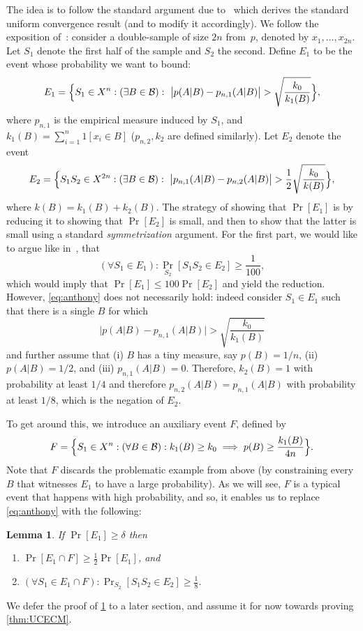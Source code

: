 \documentclass{article}
\newtheorem{lemma}[theorem]{Lemma}
\newcommand{\B}{{\cal B}}
\newcommand{\comment}[3]{\marginpar{\textcolor{#2}{#1: #3}}}
\newcommand{\yoav}[1]{\comment{Yoav}{blue}{#1}}
\begin{document}
The idea is to follow the standard argument due to~\cite{vapnik} 
which derives the standard uniform convergence result (and to modify it accordingly). 
We follow the exposition of~\cite{anthony}:
consider a double-sample of size $2n$ from~$p$, denoted by $x_1,\ldots,x_{2n}$.
Let $S_1$ denote the first half of the sample and $S_2$ the second.
Define $E_1$ to be the event whose probability we want to bound:
\[E_1 = \Bigl\{ S_1\in X^n : (\exists B\in \B):~ 
\bigl\lvert p(A \vert B) - p_{n,1}(A \vert B) \bigr\rvert > 
\sqrt{\frac{k_0}{k_{1}(B)}} \Bigr\},\]
where $p_{n,1}$ is the empirical measure induced by $S_1$, 
and $k_{1}(B)=\sum_{i=1}^n 1[x_i\in B]$ ($p_{n,2}, k_{2}$ are defined similarly).
Let $E_2$ denote the event
\[E_2 = 
\Bigl\{
S_1S_2\in X^{2n} : (\exists B\in\B):~
\bigl\lvert p_{n,1}(A \vert B)   -  p_{n,2}(A \vert B) \bigr\rvert >  
{\frac{1}{2}}\sqrt{\frac{k_0}{k(B)}}
\Bigr\},
\]
where $k(B) = k_{1}(B)+k_{2}(B)$.
The strategy of showing that $\Pr[E_1]$ is by reducing it to showing that $\Pr[E_2]$ 
is small, and then to show that the latter is small using a standard \emph{symmetrization} argument. 
For the first part, we would like to argue like in~\cite{anthony}, that
\begin{equation}\label{eq:anthony} 
(\forall S_1\in E_1): \Pr_{S_2}[S_1S_2\in E_2]\geq \frac{1}{100},
\end{equation}
which would imply that $\Pr[E_1]\leq 100\Pr[E_2]$ and yield the reduction.
However, \ref{eq:anthony} does not necessarily hold: indeed consider
$S_1\in E_1$ such that there is a single $B$ for which 
\[
\bigl\lvert p(A \vert B) - p_{n,1}(A \vert B) \bigr\rvert > 
\sqrt{\frac{k_0}{k_{1}(B)}}
\]
and further assume that 
(i) $B$ has a tiny measure, say $p(B) = 1/n$,
(ii) $p(A\vert B)= 1/2$, and
(iii) $p_{n,1}(A\vert B) = 0$.
Therefore, $k_2(B)=1$ with probability at least $1/4$
and therefore $p_{n,2}(A \vert B)=p_{n,1}(A \vert B)$
with probability at least $1/8$, which is the negation of $E_2$.

To get around this, we introduce an auxiliary event $F$, defined by
\[F = \Bigl\{S_1\in X^{n} : (\forall B\in\B): k_{1}(B) \geq k_0 \implies p(B)\geq \frac{k_{1}(B)}{4n}\Bigr\}. \]
\yoav{I find it more natural to define the complement of $F$, i.e. the
  set of samples for which there exists a ball where the bad thing happens.}
Note that $F$ discards the problematic example from above 
(by constraining every $B$ that witnesses $E_1$ to have a large probability). 
As we will see, $F$ is a typical event that happens with high probability,
and so, it enables us to replace \ref{eq:anthony} with the following:
\begin{lemma}\label{lem:reduction}
If $\Pr[E_1]\geq \delta$ then 
\begin{enumerate}
\item $\Pr[E_1\cap F] \geq \frac{1}{2}\Pr[E_1]$, and
\item $(\forall S_1\in E_1\cap F): \Pr_{S_2}[S_1S_2\in E_2] \geq \frac{1}{8}$. 
\end{enumerate}
\end{lemma}
We defer the proof of \ref{lem:reduction} to a later section, 
and assume it for now towards proving \ref{thm:UCECM}.
\end{document}
